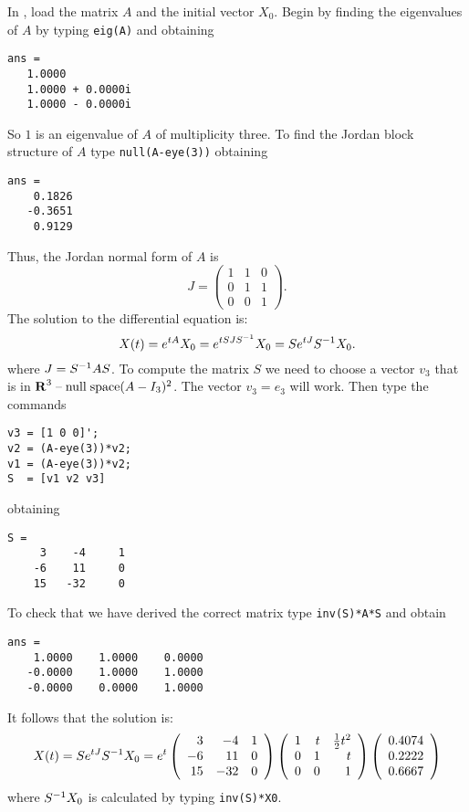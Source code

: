 \documentclass{ximera}
\begin{document}
\soln  In \Matlabp, load the matrix $A$ and the initial vector $X_0$. 
Begin by finding the eigenvalues of $A$ by typing {\tt eig(A)} and
obtaining
\begin{verbatim}
ans =
   1.0000          
   1.0000 + 0.0000i
   1.0000 - 0.0000i
\end{verbatim}
So $1$ is an eigenvalue of $A$ of multiplicity three.  To find the Jordan
block structure of $A$ type {\tt null(A-eye(3))} obtaining
\begin{verbatim}
ans =
    0.1826
   -0.3651
    0.9129
\end{verbatim}
Thus, the Jordan normal form of $A$ is 
\[
J = \left(\begin{array}{rrr} 1 & 1 & 0\\ 0 & 1 & 1\\ 0 & 0 & 1 
\end{array}\right).
\]
The solution to the differential equation is:
\[
X(t) = e^{tA}X_0 = e^{tSJS^{-1}}X_0= Se^{tJ}S^{-1} X_0.
\]
where $J=S^{-1} AS$.  To compute the matrix $S$ we need to choose a vector 
$v_3$ that is in $\mbox{$\bf{R}$}^3\;\mbox{--}\;{\rm null\;space}(A-I_3)^2$.  The vector $v_3=e_3$ will
work. Then type the commands
\begin{verbatim}
v3 = [1 0 0]';
v2 = (A-eye(3))*v2;
v1 = (A-eye(3))*v2;
S  = [v1 v2 v3]
\end{verbatim}
obtaining
\begin{verbatim}
S =
     3    -4     1
    -6    11     0
    15   -32     0
\end{verbatim}
To check that we have derived the correct matrix type {\tt inv(S)*A*S}
and obtain
\begin{verbatim}
ans =
    1.0000    1.0000    0.0000
   -0.0000    1.0000    1.0000
   -0.0000    0.0000    1.0000
\end{verbatim}
It follows that the solution is:
\[
X(t) = Se^{tJ}S^{-1} X_0 = e^t\left(\begin{array}{rrr}
     3  &  -4   &   1\\
    -6   &  11   &   0\\
    15   & -32   &   0 \end{array}\right)
\left(\begin{array}{rrr}
     1  &  t   &   \frac{1}{2}t^2\\
    0   &  1   &   t\\
    0   &  0   &   1 \end{array}\right)
\left(\begin{array}{r} 0.4074\\ 0.2222\\ 0.6667\end{array}\right)
\] 
where $S^{-1} X_0$ is calculated by typing {\tt inv(S)*X0}.
\end{document}

